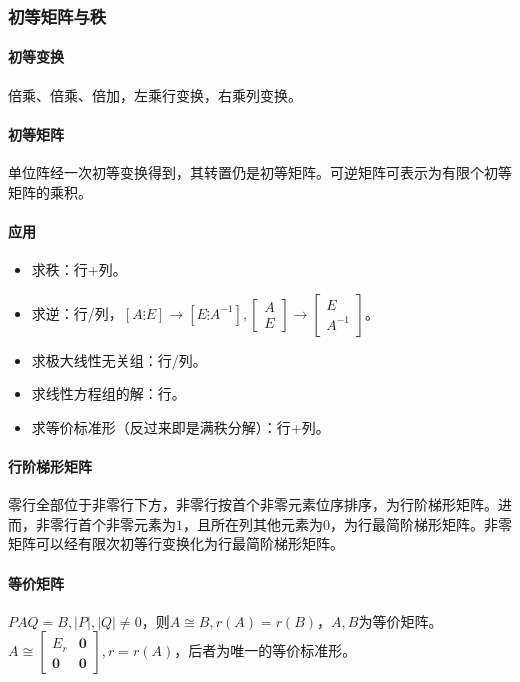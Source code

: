 \documentclass[
12pt, %
a4paper, 
oneside, %
headinclude,footinclude, %
]{scrartcl}
\begin{document}
\subsubsection[初等矩阵与秩]{初等矩阵与秩}
\paragraph{初等变换}
倍乘、倍乘、倍加，左乘行变换，右乘列变换。
\paragraph{初等矩阵}
单位阵经一次初等变换得到，其转置仍是初等矩阵。可逆矩阵可表示为有限个初等矩阵的乘积。
\paragraph{应用}
\begin{itemize}
\item 求秩：行+列。
\item 求逆：行/列，$ [A \vdots E] \rightarrow [E \vdots A^{-1}], \begin{bmatrix} A \\ E \end{bmatrix} \rightarrow \begin{bmatrix} E \\ A^{-1} \end{bmatrix} $。
\item 求极大线性无关组：行/列。
\item 求线性方程组的解：行。
\item 求等价标准形（反过来即是满秩分解）：行+列。
\end{itemize}
\paragraph{行阶梯形矩阵}
零行全部位于非零行下方，非零行按首个非零元素位序排序，为行阶梯形矩阵。进而，非零行首个非零元素为$ 1 $，且所在列其他元素为$ 0 $，为行最简阶梯形矩阵。非零矩阵可以经有限次初等行变换化为行最简阶梯形矩阵。
\paragraph{等价矩阵}
$ PAQ = B, |P|,|Q| \neq 0 $，则$ A \cong B, r(A) = r(B) $，$ A,B $为等价矩阵。$ A \cong \begin{bmatrix} E_r & \mathbf{0} \\ \mathbf{0} & \mathbf{0} \end{bmatrix}, r = r(A) $，后者为唯一的等价标准形。
\end{document}
